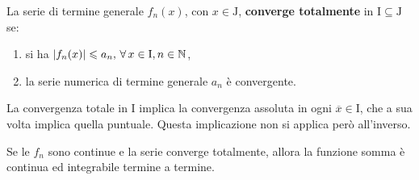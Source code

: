 \documentclass[../../analisi2]{subfiles}
\begin{document}
        \begin{definizione}
            La serie di termine generale \(f_n(x)\), con \(x \in \mathrm{J}\), \textbf{converge totalmente} in
            \(\mathrm{I} \subseteq \mathrm{J}\) se:
            \begin{enumerate}
                \item si ha \(\left|f_n(x)\right| \leqslant a_n, \, \forall \, x \in \mathrm{I}, n \in \mathbb{N}\),
                \item la serie numerica di termine generale \(a_n\) è convergente.
            \end{enumerate}
        \end{definizione}
        \begin{osservazione}
            La convergenza totale in \(\mathrm{I}\) implica la convergenza assoluta in ogni \(\overline{x} \in \mathrm{I}\), che a
            sua volta implica quella puntuale. Questa implicazione non si applica però all'inverso.
        \end{osservazione}
        \begin{osservazione}
            Se le \(f_n\) sono continue e la serie converge totalmente, allora la funzione somma è continua ed integrabile termine
            a termine.
        \end{osservazione}
\end{document}
